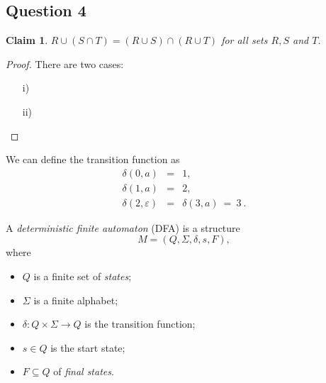 \documentclass[11pt]{article}
\newtheorem*{claim}{Claim}
\begin{document}
\subsection*{Question 4}

\begin{claim}
$R \cup (S \cap T) = (R \cup S) \cap (R \cup T)$ for all sets $R,S$ and $T$.
\end{claim}

\begin{proof}
There are two cases:
\begin{itemize}
\item[i)]
\item[ii)]
\end{itemize}
\end{proof}



\newpage
\vspace*{2pt}




\noindent We can define the transition function as
\begin{eqnarray*}
\delta(0, a) & = & 1,\\
\delta( 1, a) & = & 2,\\
\delta(2, \varepsilon) & = & \delta(3,a) ~=~3~.
\end{eqnarray*}


\noindent A \emph{deterministic finite automaton} (DFA) is a structure 
\[ M = (Q, \Sigma, \delta, s, F), \]
where
\begin{itemize}
\item $Q$ is a finite set of \emph{states};
\item $\Sigma$ is a finite alphabet;
\item $\delta: Q \times \Sigma \rightarrow Q$ is the transition function;
\item $s \in Q$ is the start state;
\item $F \subseteq Q$  of \emph{final states}.
\end{itemize}








\vspace*{50pt}
\end{document}
